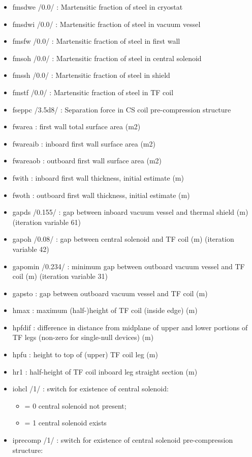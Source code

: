 \documentclass[]{article}
\providecommand{\tightlist}{%
  \setlength{\itemsep}{0pt}\setlength{\parskip}{0pt}}
\begin{document}
\begin{itemize}
\begin{itemize}
  \item
    fmsdwe /0.0/ : Martensitic fraction of steel in cryostat
  \item
    fmsdwi /0.0/ : Martensitic fraction of steel in vacuum vessel
  \item
    fmsfw /0.0/ : Martensitic fraction of steel in first wall
  \item
    fmsoh /0.0/ : Martensitic fraction of steel in central solenoid
  \item
    fmssh /0.0/ : Martensitic fraction of steel in shield
  \item
    fmstf /0.0/ : Martensitic fraction of steel in TF coil
  \item
    fseppc /3.5d8/ : Separation force in CS coil pre-compression
    structure
  \item
    fwarea : first wall total surface area (m2)
  \item
    fwareaib : inboard first wall surface area (m2)
  \item
    fwareaob : outboard first wall surface area (m2)
  \item
    fwith : inboard first wall thickness, initial estimate (m)
  \item
    fwoth : outboard first wall thickness, initial estimate (m)
  \item
    gapds /0.155/ : gap between inboard vacuum vessel and thermal shield
    (m) (iteration variable 61)
  \item
    gapoh /0.08/ : gap between central solenoid and TF coil (m)
    (iteration variable 42)
  \item
    gapomin /0.234/ : minimum gap between outboard vacuum vessel and TF
    coil (m) (iteration variable 31)
  \item
    gapsto : gap between outboard vacuum vessel and TF coil (m)
  \item
    hmax : maximum (half-)height of TF coil (inside edge) (m)
  \item
    hpfdif : difference in distance from midplane of upper and lower
    portions of TF legs (non-zero for single-null devices) (m)
  \item
    hpfu : height to top of (upper) TF coil leg (m)
  \item
    hr1 : half-height of TF coil inboard leg straight section (m)
  \item
    iohcl /1/ : switch for existence of central solenoid:

    \begin{itemize}
    \tightlist
    \item
      = 0 central solenoid not present;
    \item
      = 1 central solenoid exists
    \end{itemize}
  \item
    iprecomp /1/ : switch for existence of central solenoid
    pre-compression structure:


\end{itemize}
\end{itemize}
\end{document}

